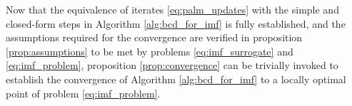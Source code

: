 Now that the equivalence of iterates \eqref{eq:palm_updates} with the simple and closed-form steps in Algorithm \ref{alg:bcd_for_imf} is fully established, and the assumptions required for the convergence are verified in proposition \ref{prop:assumptions} to be met by problems \eqref{eq:imf_surrogate} and \eqref{eq:imf_problem}, proposition \ref{prop:convergence} can be trivially invoked to establish the convergence of Algorithm \ref{alg:bcd_for_imf} to a locally optimal point of problem \eqref{eq:imf_problem}.



